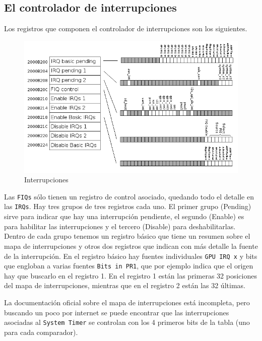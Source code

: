 \subsection{El controlador de interrupciones}

Los registros que componen el controlador de interrupciones son los siguientes.

\begin{figure}[h]
  \centering
    \includegraphics[width=14cm]{graphs/interrupciones.png}
  \caption{Interrupciones}
  \label{fig:interrupciones}
\end{figure}

Las {\tt FIQs} sólo tienen un registro de control asociado, quedando todo el detalle
en las {\tt IRQs}. Hay tres grupos de tres
registros cada uno. El primer grupo (Pending) sirve para indicar que hay una interrupción
pendiente, el segundo (Enable) es para habilitar las interrupciones y el tercero (Disable)
para deshabilitarlas. Dentro de cada grupo tenemos un registro básico que tiene un resumen
sobre el mapa de interrupciones y otros dos registros que
indican con más detalle la fuente de la interrupción. En el registro básico
hay fuentes individuales {\tt GPU IRQ x} y bits que engloban a varias fuentes {\tt Bits in PR1},
que por ejemplo indica que el origen hay que buscarlo en el registro 1. En el registro 1 están
las primeras 32 posiciones del mapa de interrupciones, mientras que en el registro 2 están
las 32 últimas.

La documentación oficial sobre el mapa de interrupciones está incompleta, pero buscando un poco
por internet se puede encontrar que las interrupciones asociadas al {\tt System Timer} se
controlan con los 4 primeros bits de la tabla (uno para cada comparador).

